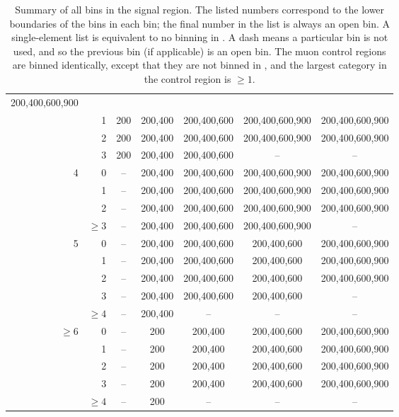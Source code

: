 \begin{table}[h!]
\begin{tabular}{r|r|ccccc}
       200,400,600,900 \\
         &      1 & 200 & 200,400 & 200,400,600 & 200,400,600,900 & 
         200,400,600,900\\
         &      2 & 200 & 200,400 & 200,400,600 & 200,400,600,900 & 
         200,400,600,900\\
         &      3 & 200 & 200,400 & 200,400,600 & --        & --\\
\hline
       4 &      0 & -- & 200,400 & 200,400,600 & 200,400,600,900 & 
       200,400,600,900 \\
         &      1 & -- & 200,400 & 200,400,600 & 200,400,600,900 & 
         200,400,600,900 \\
         &      2 & -- & 200,400 & 200,400,600 & 200,400,600,900 & 
         200,400,600,900 \\
         & $\ge3$ & -- & 200,400 & 200,400,600 & 200,400,600,900 & -- \\
\hline
       5 &      0 & -- & 200,400 & 200,400,600 & 200,400,600 & 200,400,600,900 
       \\
         &      1 & -- & 200,400 & 200,400,600 & 200,400,600 & 200,400,600,900 
         \\
         &      2 & -- & 200,400 & 200,400,600 & 200,400,600 & 200,400,600,900 
         \\
         &      3 & -- & 200,400 & 200,400,600 & 200,400,600 & -- \\
         & $\ge4$ & -- & 200,400 & -- & -- & -- \\
\hline
  $\ge6$ &      0 & -- & 200       & 200,400 & 200,400,600 & 200,400,600,900 \\
         &      1 & -- & 200       & 200,400 & 200,400,600 & 200,400,600,900 \\
         &      2 & -- & 200       & 200,400 & 200,400,600 & 200,400,600,900 \\
         &      3 & -- & 200       & 200,400 & 200,400,600 & 200,400,600,900 \\
         & $\ge4$ & -- & 200       & -- & -- & -- \\
\hline
\end{tabular}
\caption{Summary of all bins in the signal region. The listed numbers 
correspond to the lower boundaries of the \mht bins in each \njnbht bin; the 
final number in the list is always an open bin. A single-element list is 
equivalent to no binning in \mht. 
A dash means a particular \njnbht bin is not used, and so the previous \scalht 
bin (if applicable) is an open bin.
The muon control regions are binned identically, except that they are not 
binned in \mht, and the largest \nb category in the 
\mmj control region is $\ge1$.}
\label{tab:binning}
\end{table}


